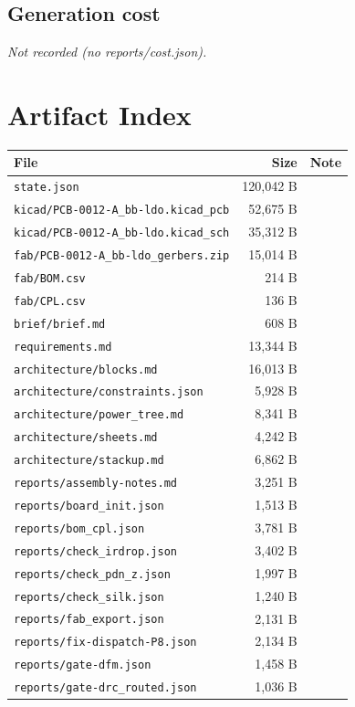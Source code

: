 \documentclass[11pt,a4paper]{article}
\begin{document}
\subsection*{Generation cost}
\emph{Not recorded (no reports/cost.json).}
\section{Artifact Index}
{\small
\begin{longtable}{p{9cm}rp{4cm}}
\toprule
\textbf{File} & \textbf{Size} & \textbf{Note} \\
\midrule
\endhead
\texttt{state.json} & 120,042 B &  \\
\texttt{kicad/PCB-0012-A\_bb-ldo.kicad\_pcb} & 52,675 B &  \\
\texttt{kicad/PCB-0012-A\_bb-ldo.kicad\_sch} & 35,312 B &  \\
\texttt{fab/PCB-0012-A\_bb-ldo\_gerbers.zip} & 15,014 B &  \\
\texttt{fab/BOM.csv} & 214 B &  \\
\texttt{fab/CPL.csv} & 136 B &  \\
\texttt{brief/brief.md} & 608 B &  \\
\texttt{requirements.md} & 13,344 B &  \\
\texttt{architecture/blocks.md} & 16,013 B &  \\
\texttt{architecture/constraints.json} & 5,928 B &  \\
\texttt{architecture/power\_tree.md} & 8,341 B &  \\
\texttt{architecture/sheets.md} & 4,242 B &  \\
\texttt{architecture/stackup.md} & 6,862 B &  \\
\texttt{reports/assembly-notes.md} & 3,251 B &  \\
\texttt{reports/board\_init.json} & 1,513 B &  \\
\texttt{reports/bom\_cpl.json} & 3,781 B &  \\
\texttt{reports/check\_irdrop.json} & 3,402 B &  \\
\texttt{reports/check\_pdn\_z.json} & 1,997 B &  \\
\texttt{reports/check\_silk.json} & 1,240 B &  \\
\texttt{reports/fab\_export.json} & 2,131 B &  \\
\texttt{reports/fix-dispatch-P8.json} & 2,134 B &  \\
\texttt{reports/gate-dfm.json} & 1,458 B &  \\
\texttt{reports/gate-drc\_routed.json} & 1,036 B &  \\

\end{longtable}}
\end{document}
